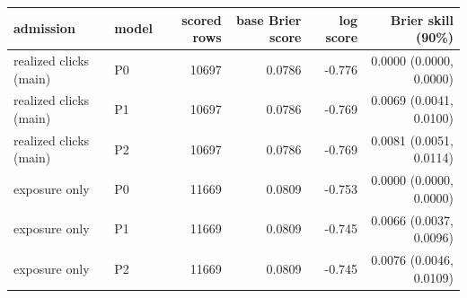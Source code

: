 \begin{tabular}{llrrrr}
\toprule
admission & model & scored rows & base Brier score & log score & Brier skill (90\%) \\
\midrule
realized clicks (main) & P0 & 10697 & 0.0786 & -0.776 & 0.0000 (0.0000, 0.0000) \\
realized clicks (main) & P1 & 10697 & 0.0786 & -0.769 & 0.0069 (0.0041, 0.0100) \\
realized clicks (main) & P2 & 10697 & 0.0786 & -0.769 & 0.0081 (0.0051, 0.0114) \\
exposure only & P0 & 11669 & 0.0809 & -0.753 & 0.0000 (0.0000, 0.0000) \\
exposure only & P1 & 11669 & 0.0809 & -0.745 & 0.0066 (0.0037, 0.0096) \\
exposure only & P2 & 11669 & 0.0809 & -0.745 & 0.0076 (0.0046, 0.0109) \\
\bottomrule
\end{tabular}
